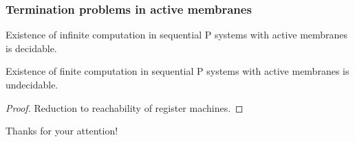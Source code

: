     \begin{frame}[t]\frametitle{Termination problems in active membranes}
      \begin{theorem}
        Existence of infinite computation in sequential P systems with active membranes is decidable.
      \end{theorem}
      \pause

      \begin{theorem}
        Existence of finite computation in sequential P systems with active membranes is undecidable.
      \end{theorem}
      \pause

      \begin{proof}
        Reduction to reachability of register machines.
      \end{proof}
    \end{frame}



\begin{frame}[plain]
  
\end{frame}


\begin{frame}[plain]
  \begin{center}
    Thanks for your attention!
  \end{center}
\end{frame}


